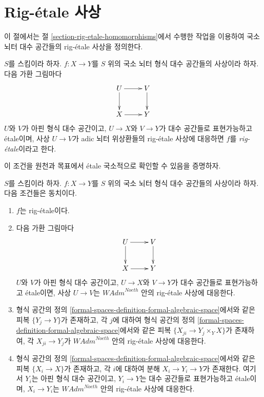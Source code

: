 \section{Rig-\'etale 사상}
\label{section-rig-etale-morphisms}

\noindent
이 절에서는 절 \ref{section-rig-etale-homomorphisms}에서 수행한 작업을 이용하여
국소 뇌터 대수 공간들의 rig-\'etale 사상을 정의한다.

\begin{definition}
\label{definition-rig-etale}
$S$를 스킴이라 하자. $f : X \to Y$를 $S$ 위의 국소 뇌터
형식 대수 공간들의 사상이라 하자. 다음 가환 그림마다
$$
\xymatrix{
U \ar[d] \ar[r] & V \ar[d] \\
X \ar[r] & Y
}
$$
$U$와 $V$가 아핀 형식 대수 공간이고, $U \to X$와 $V \to Y$가
대수 공간들로 표현가능하고 \'etale이며, 사상 $U \to V$가
adic 뇌터 위상환들의 rig-\'etale 사상에 대응하면 $f$를
{\it rig-\'etale}이라고 한다.
\end{definition}

\noindent
이 조건을 원천과 목표에서 \'etale 국소적으로 확인할 수 있음을 증명하자.

\begin{lemma}
\label{lemma-rig-etale-morphisms}
$S$를 스킴이라 하자. $f : X \to Y$를 $S$ 위의 국소 뇌터
형식 대수 공간들의 사상이라 하자. 다음 조건들은 동치이다.
\begin{enumerate}
\item $f$는 rig-\'etale이다.
\item 다음 가환 그림마다
$$
\xymatrix{
U \ar[d] \ar[r] & V \ar[d] \\
X \ar[r] & Y
}
$$
$U$와 $V$가 아핀 형식 대수 공간이고, $U \to X$와 $V \to Y$가
대수 공간들로 표현가능하고 \'etale이면, 사상 $U \to V$는
$\textit{WAdm}^{Noeth}$ 안의 rig-\'etale 사상에 대응한다.
\item 형식 공간의 정의
\ref{formal-spaces-definition-formal-algebraic-space}에서와 같은
피복 $\{Y_j \to Y\}$가 존재하고, 각 $j$에 대하여 형식 공간의 정의
\ref{formal-spaces-definition-formal-algebraic-space}에서와 같은
피복 $\{X_{ji} \to Y_j \times_Y X\}$가 존재하여, 각
$X_{ji} \to Y_j$가 $\textit{WAdm}^{Noeth}$ 안의 rig-\'etale 사상에 대응한다.
\item 형식 공간의 정의
\ref{formal-spaces-definition-formal-algebraic-space}에서와 같은
피복 $\{X_i \to X\}$가 존재하고, 각 $i$에 대하여 분해
$X_i \to Y_i \to Y$가 존재한다. 여기서 $Y_i$는 아핀 형식 대수 공간이고,
$Y_i \to Y$는 대수 공간들로 표현가능하고 \'etale이며,
$X_i \to Y_i$는 $\textit{WAdm}^{Noeth}$ 안의 rig-\'etale 사상에 대응한다.
\end{enumerate}
\end{lemma}


